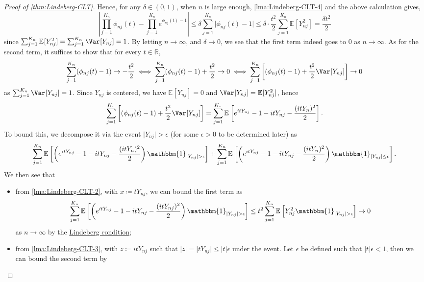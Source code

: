 \begin{proof}[Proof of \autoref{thm:Lindeberg-CLT}]
	Hence, for any \(\delta \in (0, 1)\), when \(n\) is large enough, \autoref{lma:Lindeberg-CLT-4} and the above calculation gives,
	\[
		\left\vert \prod_{j=1}^{K_n} \phi _{nj}(t) - \prod_{j=1}^{K_n} e^{\phi _{nj}(t) - 1} \right\vert
		\leq \delta \sum_{j=1}^{K_n} \vert \phi _{nj}(t) - 1 \vert
		\leq \delta \cdot \frac{t^2}{2} \sum_{j=1}^{K_n} \mathbb{E}_{}[Y_{nj}^2]
		= \frac{\delta t^2}{2}
	\]
	since \(\sum_{j=1}^{K_n} \mathbb{E}_{}[Y_{nj}^2] = \sum_{j=1}^{K_n} \Var_{}[Y_{nj}] = 1\). By letting \(n \to \infty \), and \(\delta \to 0\), we see that the first term indeed goes to \(0\) as \(n \to \infty \). As for the second term, it suffices to show that for every \(t \in \mathbb{R} \),
	\[
		\sum_{j=1}^{K_n} (\phi _{nj}(t) - 1) \to - \frac{t^2}{2}
		\iff \sum_{j=1}^{K_n} (\phi _{nj}(t) - 1) + \frac{t^2}{2} \to 0
		\iff \sum_{j=1}^{K_n} \left[ (\phi _{nj}(t) - 1) + \frac{t^2}{2} \Var_{}[Y_{nj}] \right] \to 0
	\]
	as \(\sum_{j=1}^{K_n} \Var_{}[Y_{nj}] = 1\). Since \(Y_{nj}\) is centered, we have \(\mathbb{E}_{}[Y_{nj}] = 0\) and \(\Var_{}[Y_{nj}] = \mathbb{E}_{}[Y_{nj}^2] \), hence
	\[
		\sum_{j=1}^{K_n} \left[ (\phi _{nj}(t) - 1) + \frac{t^2}{2} \Var_{}[Y_{nj}] \right]
		= \sum_{j=1}^{K_n} \mathbb{E}_{}\left[e^{i t Y_{nj}} - 1 - i t Y_{nj} - \frac{(i t Y_n)^2}{2} \right].
	\]
	To bound this, we decompose it via the event \(\vert Y_{nj} \vert > \epsilon \) (for some \(\epsilon > 0\) to be determined later) as
	\[
		\sum_{j=1}^{K_n} \mathbb{E}_{}\left[\left( e^{i t Y_{nj}} - 1 - i t Y_{nj} - \frac{(i t Y_n)^2}{2} \right) \mathbbm{1}_{\vert Y_{nj} \vert > \epsilon } \right]
		+ \sum_{j=1}^{K_n} \mathbb{E}_{}\left[\left( e^{i t Y_{nj}} - 1 - i t Y_{nj} - \frac{(i t Y_n)^2}{2} \right) \mathbbm{1}_{\vert Y_{nj} \vert \leq \epsilon } \right].
	\]
	We then see that
	\begin{itemize}
		\item from \autoref{lma:Lindeberg-CLT-2}, with \(x \coloneqq t Y_{nj}\), we can bound the first term as
		      \[
			      \sum_{j=1}^{K_n} \mathbb{E}_{}\left[\left( e^{i t Y_{nj}} - 1 - i t Y_{nj} - \frac{(i t Y_{nj})^2}{2} \right) \mathbbm{1}_{\vert Y_{nj} \vert > \epsilon } \right]
			      \leq t^2 \sum_{j=1}^{K_n} \mathbb{E}_{}\left[Y_{nj}^2 \mathbbm{1}_{\vert Y_{nj} \vert > \epsilon } \right]
			      \to 0
		      \]
		      as \(n\to \infty \) by the \hyperref[def:Lindeberg-condition]{Lindeberg condition};
		\item from \autoref{lma:Lindeberg-CLT-3}, with \(z \coloneqq i t Y_{nj}\) such that \(\vert z \vert = \vert t Y_{nj} \vert \leq \vert t \vert \epsilon \) under the event. Let \(\epsilon \) be defined such that \(\vert t \vert \epsilon < 1\), then we can bound the second term by

\end{itemize}
\end{proof}
